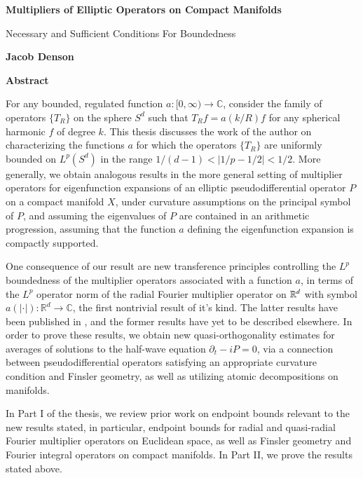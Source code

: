 
\fancyhf{} %
\fancyhead[RO,R]{\thepage} %
\renewcommand{\headrulewidth}{0pt}

\begin{center}
    \Large
    \textbf{Multipliers of Elliptic Operators on Compact Manifolds}
    
    \vspace{0.4cm}
    \large
    Necessary and Sufficient Conditions For Boundedness
    
    \vspace{0.4cm}
    \textbf{Jacob Denson}
    
    \vspace{0.9cm}
    \textbf{Abstract}
\end{center}

For any bounded, regulated function $a: [0,\infty) \to \mathbb{C}$, consider the family of operators $\{ T_R \}$ on the sphere $S^d$ such that $T_R f = a(k/R) f$ for any spherical harmonic $f$ of degree $k$. This thesis discusses the work of the author on characterizing the functions $a$ for which the operators $\{ T_R \}$ are uniformly bounded on $L^p(S^d)$ in the range $1/(d-1) < |1/p - 1/2| < 1/2$. More generally, we obtain analogous results in the more general setting of multiplier operators for eigenfunction expansions of an elliptic pseudodifferential operator $P$ on a compact manifold $X$, under curvature assumptions on the principal symbol of $P$, and assuming the eigenvalues of $P$ are contained in an arithmetic progression, assuming that the function $a$ defining the eigenfunction expansion is compactly supported.

One consequence of our result are new transference principles controlling the $L^p$ boundedness of the multiplier operators associated with a function $a$, in terms of the $L^p$ operator norm of the radial Fourier multiplier operator on $\operatorname{\mathbb{R}}^d$ with symbol $a(|\cdot|): \mathbb{R}^d \to \mathbb{C}$, the first nontrivial result of it's kind. The latter results have been published in \cite{Denson}, and the former results have yet to be described elsewhere. In order to prove these results, we obtain new quasi-orthogonality estimates for averages of solutions to the half-wave equation $\partial_t - i P = 0$, via a connection between pseudodifferential operators satisfying an appropriate curvature condition and Finsler geometry, as well as utilizing atomic decompositions on manifolds.

In Part I of the thesis, we review prior work on endpoint bounds relevant to the new results stated, in particular, endpoint bounds for radial and quasi-radial Fourier multiplier operators on Euclidean space, as well as Finsler geometry and Fourier integral operators on compact manifolds. In Part II, we prove the results stated above.